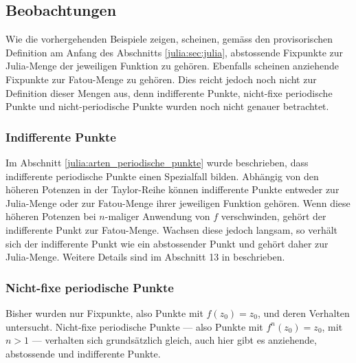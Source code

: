\subsection{Beobachtungen}
\label{julia:sec:beobachtungen}
Wie die vorhergehenden Beispiele zeigen, scheinen, gemäss den provisorischen Definition am Anfang des Abschnitts \ref{julia:sec:julia}, abstossende Fixpunkte zur Julia-Menge der jeweiligen Funktion zu gehören.
Ebenfalls scheinen anziehende Fixpunkte zur Fatou-Menge zu gehören.
Dies reicht jedoch noch nicht zur Definition dieser Mengen aus, denn indifferente Punkte, nicht-fixe periodische Punkte und nicht-periodische Punkte wurden noch nicht genauer betrachtet.

\subsubsection{Indifferente Punkte}
\label{julia:sec:indifferent}
Im Abschnitt \ref{julia:arten_periodische_punkte} wurde beschrieben, dass indifferente periodische Punkte einen Spezialfall bilden.
Abhängig von den höheren Potenzen in der Taylor-Reihe können indifferente Punkte entweder zur Julia-Menge oder zur Fatou-Menge ihrer jeweiligen Funktion gehören.
Wenn diese höheren Potenzen bei $n$-maliger Anwendung von $f$ verschwinden, gehört der indifferente Punkt zur Fatou-Menge.
Wachsen diese jedoch langsam, so verhält sich der indifferente Punkt wie ein abstossender Punkt und gehört daher zur Julia-Menge.
Weitere Details sind im Abschnitt 13 in \cite{julia:indifferente_punkte} beschrieben.

\subsubsection{Nicht-fixe periodische Punkte}
\label{julia:sec:nicht_fix_periodisch}
Bisher wurden nur Fixpunkte, also Punkte mit $f(z_0) = z_0$, und deren Verhalten untersucht.
Nicht-fixe periodische Punkte --- also Punkte mit $f^n(z_0) = z_0$, mit $n > 1$ --- verhalten sich grundsätzlich gleich, auch hier gibt es anziehende, abstossende und indifferente Punkte.

